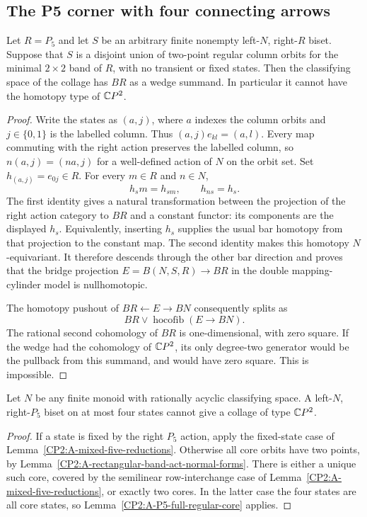 \subsection{The P5 corner with four connecting arrows}

\begin{lemma}
\label{CP2:A-P5-full-regular-core}
Let $R=P_5$ and let $S$ be an arbitrary finite nonempty
left-$N$, right-$R$ biset. Suppose that $S$ is a disjoint union
of two-point regular column orbits for the minimal $2\times2$
band of $R$, with no transient or fixed states. Then the
classifying space of the collage has $BR$ as a wedge summand.
In particular it cannot have the homotopy type of $\mathbb{C}P^2$.
\end{lemma}
\begin{proof}
Write the states as $(a,j)$, where $a$ indexes the column
orbits and $j\in\{0,1\}$ is the labelled column. Thus
$(a,j)e_{kl}=(a,l)$. Every map commuting with the right action
preserves the labelled column, so $n(a,j)=(na,j)$ for a
well-defined action of $N$ on the orbit set. Set
$h_{(a,j)}=e_{0j}\in R$. For every $m\in R$ and $n\in N$,
\[
 h_s m=h_{sm},\qquad h_{ns}=h_s.
\]
The first identity gives a natural transformation between the
projection of the right action category to $BR$ and a constant
functor: its components are the displayed $h_s$. Equivalently,
inserting $h_s$ supplies the usual bar homotopy from that
projection to the constant map. The second identity makes
this homotopy $N$-equivariant. It therefore descends through
the other bar direction and proves that the bridge projection
$E=B(N,S,R)\longrightarrow BR$ in the double mapping-cylinder
model is nullhomotopic.

The homotopy pushout of $BR\leftarrow E\to BN$ consequently
splits as
\[
 BR\vee\operatorname{hocofib}(E\longrightarrow BN).
\]
The rational second cohomology of $BR$ is one-dimensional,
with zero square. If the wedge had the cohomology of $\mathbb{C}P^2$,
its only degree-two generator would be the pullback from this
summand, and would have zero square. This is impossible.
\end{proof}

\begin{lemma}
\label{CP2:A-P5-four-state-acyclic-opposite}
Let $N$ be any finite monoid with rationally acyclic classifying
space. A left-$N$, right-$P_5$ biset on at most four states
cannot give a collage of type $\mathbb{C}P^2$.
\end{lemma}
\begin{proof}
If a state is fixed by the right $P_5$ action, apply the
fixed-state case of Lemma~\ref{CP2:A-mixed-five-reductions}.
Otherwise all core orbits have two points, by
Lemma~\ref{CP2:A-rectangular-band-act-normal-forms}.
There is either a unique such core, covered by the
semilinear row-interchange case of
Lemma~\ref{CP2:A-mixed-five-reductions}, or exactly two cores.
In the latter case the four states are all core states, so
Lemma~\ref{CP2:A-P5-full-regular-core} applies.
\end{proof}

